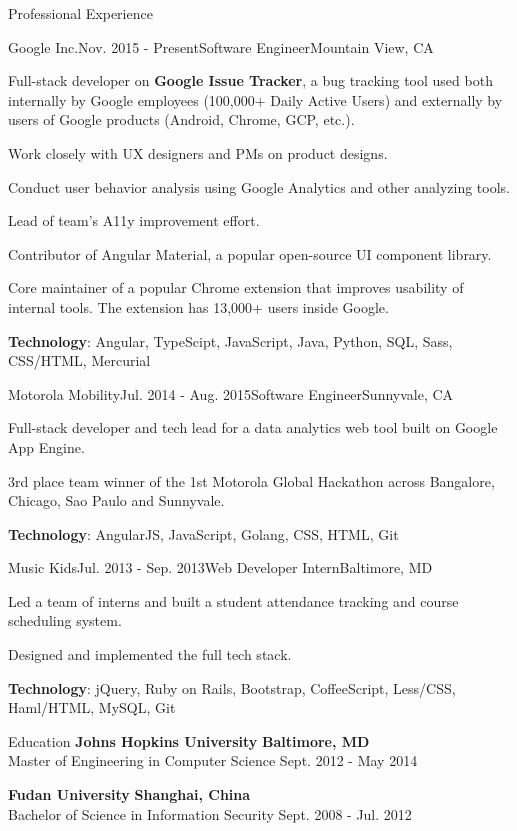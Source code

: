 \documentclass{resume} %
\begin{document}
\begin{rSection}{Professional Experience}

\begin{rSubsection}{Google Inc.}{Nov. 2015 - Present}{Software Engineer}{Mountain View, CA}
\item Full-stack developer on \textbf{Google Issue Tracker}, a bug tracking tool used both internally by Google employees (100,000+ Daily Active Users) and externally by users of Google products (Android, Chrome, GCP, etc.).
\item Work closely with UX designers and PMs on product designs.
\item Conduct user behavior analysis using Google Analytics and other analyzing tools.
\item Lead of team's A11y improvement effort.
\item Contributor of Angular Material, a popular open-source UI component library.
\item Core maintainer of a popular Chrome extension that improves usability of internal tools. The extension has 13,000+ users inside Google.
\item \textbf{Technology}: Angular, TypeScipt, JavaScript, Java, Python, SQL, Sass, CSS/HTML, Mercurial

\end{rSubsection}

\begin{rSubsection}{Motorola Mobility}{Jul. 2014 - Aug. 2015}{Software Engineer}{Sunnyvale, CA}
\item Full-stack developer and tech lead for a data analytics web tool built on Google App Engine.
\item 3rd place team winner of the 1st Motorola Global Hackathon across Bangalore, Chicago, Sao Paulo and Sunnyvale.
\item \textbf{Technology}: AngularJS, JavaScript, Golang, CSS, HTML, Git
\end{rSubsection}

\begin{rSubsection}{Music Kids}{Jul. 2013 - Sep. 2013}{Web Developer Intern}{Baltimore, MD}
\item Led a team of interns and built a student attendance tracking and course scheduling system.
\item Designed and implemented the full tech stack.
\item \textbf{Technology}: jQuery, Ruby on Rails, Bootstrap, CoffeeScript, Less/CSS, Haml/HTML, MySQL, Git
\end{rSubsection}

\end{rSection}



\begin{rSection}{Education}
{\bf Johns Hopkins University} \hfill {\bf Baltimore, MD} \\
{Master of Engineering in Computer Science} \hfill {Sept. 2012 - May 2014}

{\bf Fudan University} \hfill {\bf Shanghai, China} \\
{Bachelor of Science in Information Security} \hfill {Sept. 2008 - Jul. 2012}
\end{rSection}
\end{document}

